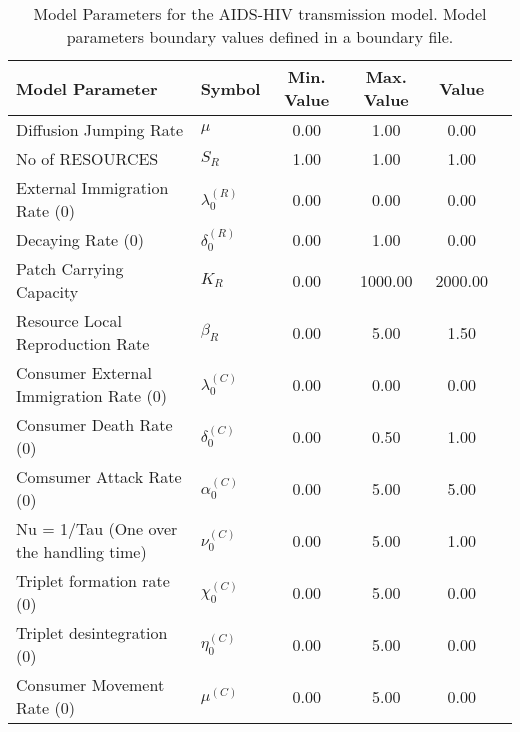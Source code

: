 \begin{table}
\centering
\begin{tabular}{p{5cm}lcccc}
{\bf Model Parameter} & {\bf Symbol} & {\bf Min. Value} & {\bf Max. Value} & {\bf Value}\\
\hline\hline
Diffusion Jumping Rate & $\mu$ & 0.00 & 1.00 & 0.00\\
No of RESOURCES & $S_R$ & 1.00 & 1.00 & 1.00\\
External Immigration Rate (0) & $\lambda^{(R)}_0$ & 0.00 & 0.00 & 0.00\\
Decaying Rate (0) & $\delta^{(R)}_0$ & 0.00 & 1.00 & 0.00\\
Patch Carrying Capacity & $K_R$ & 0.00 & 1000.00 & 2000.00\\
Resource Local Reproduction Rate & $\beta_R$ & 0.00 & 5.00 & 1.50\\
Consumer External Immigration Rate (0) & $\lambda^{(C)}_0$ & 0.00 & 0.00 & 0.00\\
Consumer Death Rate (0) & $\delta^{(C)}_0$ & 0.00 & 0.50 & 1.00\\
Comsumer Attack Rate (0) & $\alpha^{(C)}_0$ & 0.00 & 5.00 & 5.00\\
Nu = 1/Tau (One over the handling time) & $\nu^{(C)}_0$ & 0.00 & 5.00 & 1.00\\
Triplet formation rate (0) & $\chi^{(C)}_0$ & 0.00 & 5.00 & 0.00\\
Triplet desintegration (0) & $\eta^{(C)}_0$ & 0.00 & 5.00 & 0.00\\
Consumer Movement Rate (0) & $\mu^{(C)}$ & 0.00 & 5.00 & 0.00\\
\hline\hline
\end{tabular}
\caption{Model Parameters for the AIDS-HIV transmission model. Model parameters boundary values defined in a boundary file.}
\end{table}
